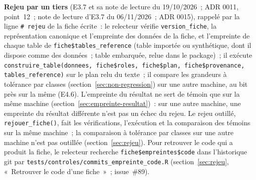 \documentclass[a4paper,11pt]{article}
\newcommand{\code}[1]{\texttt{\small #1}}
\begin{document}
\medskip
\textbf{Rejeu par un tiers} (E3.7 et sa note de lecture du 19/10/2026~; ADR
0011, point~12~; note de lecture d'E3.7 du 06/11/2026~; ADR 0015), rappelé
par la ligne \code{\# rejeu} de la fiche écrite~: le
relecteur vérifie \code{version\_fiche}, la représentation canonique et
l'empreinte des données de la fiche, et l'empreinte de chaque table de
\code{fiche\$tables\_reference} (table importée ou synthétique, dont il
dispose comme des données~; table embarquée, relue dans le package)~; il
exécute
\code{construire\_table(donnees, fiche\$roles, fiche\$plan, fiche\$provenance, tables\_reference)}
sur le plan relu du texte~; il compare les grandeurs à tolérance par classes
(section~\ref{sec:non-regression}) sur une autre machine, au bit près sur la
même (E4.6). L'empreinte du résultat ne sert de témoin que sur la même
machine (section~\ref{sec:empreinte-resultat})~: sur une autre machine, une
empreinte du résultat différente n'est pas un échec du rejeu. Le rejeu
outillé, \code{rejouer\_fiche()}, fait les vérifications, l'exécution et la
comparaison des témoins sur la même machine~; la comparaison à tolérance par
classes sur une autre machine n'est pas outillée (section~\ref{sec:rejeu}).
Pour retrouver le code qui a produit la fiche, le relecteur recherche
\code{fiche\$empreintes\$code} dans l'historique git par
\code{tests/controles/commits\_empreinte\_code.R} (section~\ref{sec:rejeu},
«~Retrouver le code d'une fiche~»~; issue~\#89).
\end{document}
